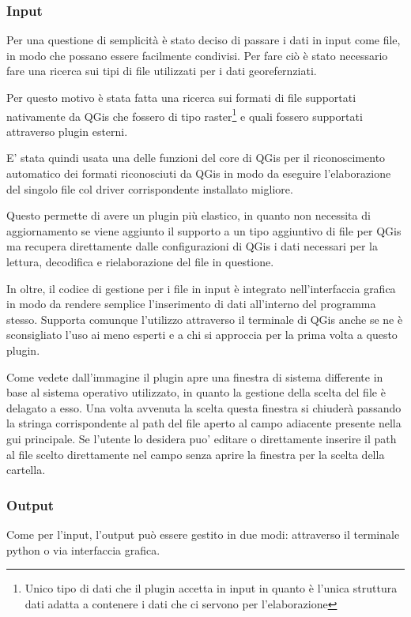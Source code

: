 \subsubsection{Input}
Per una questione di semplicità è stato deciso di passare i dati in input come file, in modo che possano essere facilmente condivisi. Per fare ciò è stato necessario fare una ricerca sui tipi di file utilizzati per i dati georefernziati.

Per questo motivo è stata fatta una ricerca sui formati di file supportati nativamente da QGis che fossero di tipo raster\footnote{Unico tipo di dati che il plugin accetta in input in quanto è l'unica struttura dati adatta a contenere i dati che ci servono per l'elaborazione} e quali fossero supportati attraverso plugin esterni.

E' stata quindi usata una delle funzioni del core di QGis per il riconoscimento automatico dei formati riconosciuti da QGis in modo da eseguire l'elaborazione del singolo file col driver corrispondente installato migliore.

Questo permette di avere un plugin più elastico, in quanto non necessita di aggiornamento se viene aggiunto il supporto a un tipo aggiuntivo di file per QGis ma recupera direttamente dalle configurazioni di QGis i dati necessari per la lettura, decodifica e rielaborazione del file in questione.

In oltre, il codice di gestione per i file in input è integrato nell'interfaccia grafica in modo da rendere semplice l'inserimento di dati all'interno del programma stesso. Supporta comunque l'utilizzo attraverso il terminale di QGis anche se ne è sconsigliato l'uso ai meno esperti e a chi si approccia per la prima volta a questo plugin.

Come vedete dall'immagine il plugin apre una finestra di sistema differente in base al sistema operativo utilizzato, in quanto la gestione della scelta del file è delagato a esso. Una volta avvenuta la scelta questa finestra si chiuderà passando la stringa corrispondente al path del file aperto al campo adiacente presente nella gui principale. %
Se l'utente lo desidera puo' editare o direttamente inserire il path al file scelto direttamente nel campo senza aprire la finestra per la scelta della cartella.

\subsubsection{Output}
Come per l'input, l'output può essere gestito in due modi: attraverso il terminale python o via interfaccia grafica.

